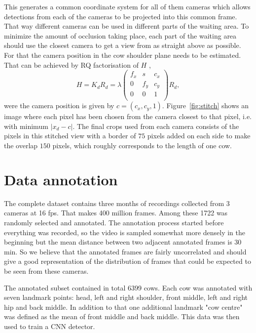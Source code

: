 \documentclass{IET}
\begin{document}
This generates a common coordinate system for all of them cameras which allows detections from each of the cameras to be projected into this common frame. That way different cameras can be used in different parts of the waiting area. To minimize the amount of occlusion taking place, each part of the waiting area should use the closest camera to get a view from as straight above as possible. For that the camera position in the cow shoulder plane needs to be estimated. That can be achieved by RQ factorisation of $H$ \cite{Hartley2004}, 
\begin{equation}
H = K_d R_d = 
    \lambda
	\left(
	\begin{array}{ccc}
		f_x & s & c_x  \\
		0 & f_y & c_y  \\
		0 & 0 & 1  \\
	\end{array}
	\right)
	R_d ,
\end{equation}
were the camera position is given by $c = \left(c_x, c_y, 1\right)$. Figure~\ref{fig:stitch} shows an image where each pixel has been chosen from the camera closest to that pixel, i.e. with  minimum $\left| x_d - c \right|$. The final crops used from each camera consists of the pixels in this stitched view with a border of $75$ pixels added on each side to make the overlap $150$ pixels, which roughly corresponds to the length of one cow.


\section{Data annotation}

The complete dataset contains three months of recordings collected from 3 cameras at 16 fps. That makes 400 million frames. Among these 1722 was randomly selected and annotated. The annotation process started before everything was recorded, so the video is sampled somewhat more densely in the beginning but the mean distance between two adjacent annotated frames is 30 min. So we believe that the annotated frames are fairly uncorrelated and should give a good representation of the distribution of frames that could be expected to be seen from these cameras.

The annotated subset contained in total 6399 cows. Each cow was annotated with seven landmark points: head, left and right shoulder, front middle, left and right hip and back middle. In addition to that one additional landmark "cow centre" was defined as the mean of front middle and back middle. This data was then used to train a CNN detector.
\end{document}
